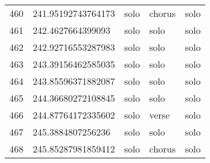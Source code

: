 \begin{table}[]
\begin{tabular}{lllll}
    460  & 241.95192743764173 & solo         & chorus          & solo           \\
    461  & 242.4627664399093  & solo         & solo            & solo           \\
    462  & 242.92716553287983 & solo         & solo            & solo           \\
    463  & 243.39156462585035 & solo         & solo            & solo           \\
    464  & 243.85596371882087 & solo         & solo            & solo           \\
    465  & 244.36680272108845 & solo         & solo            & solo           \\
    466  & 244.87764172335602 & solo         & verse           & solo           \\
    467  & 245.3884807256236  & solo         & solo            & solo           \\
    468  & 245.85287981859412 & solo         & chorus          & solo          
    \end{tabular}
    \label{tab:lstm_1200}
\end{table}
